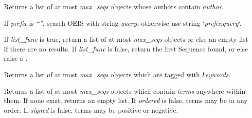 \documentclass[letterpaper,10pt,english]{sphinxmanual}
\begin{document}
\begin{fulllineitems}
\begin{fulllineitems}
\label{api:OEISClient.lookup_by_author}
Returns a list of at most \emph{max\_seqs} {\hyperref[api:sequence.Sequence]{\emph{}}}
objects whose authors contain \emph{author}.

\end{fulllineitems}


\begin{fulllineitems}
\label{api:client.OEISClient.lookup_by}
If \emph{prefix} is \emph{``''}, search OEIS with string \emph{query},
otherwise use string `\emph{prefix}:\emph{query}`.

If \emph{list\_func} is true, return a list of at most
\emph{max\_seqs} {\hyperref[api:sequence.Sequence]{\emph{}}} objects or
else an empty list if there are no results. If \emph{list\_func}
is false, return the first Sequence found, or else raise a
{\hyperref[api:errors.NoResultsError]{\emph{}}}.

\end{fulllineitems}


\begin{fulllineitems}
\label{api:client.OEISClient.lookup_by_keywords}
Returns a list of at most \emph{max\_seqs}
{\hyperref[api:sequence.Sequence]{\emph{}}} objects which are
tagged with \emph{keywords}.

\end{fulllineitems}


\begin{fulllineitems}
\label{api:client.OEISClient.lookup_by_terms}
Returns a list of at most \emph{max\_seqs}
{\hyperref[api:sequence.Sequence]{\emph{}}} objects which
contain \emph{terms} anywhere within them. If none exist,
returns an empty list. If \emph{ordered} is false, terms may be
in any order. If \emph{signed} is false, terms may be positive
or negative.

\end{fulllineitems}


\end{fulllineitems}
\end{document}

